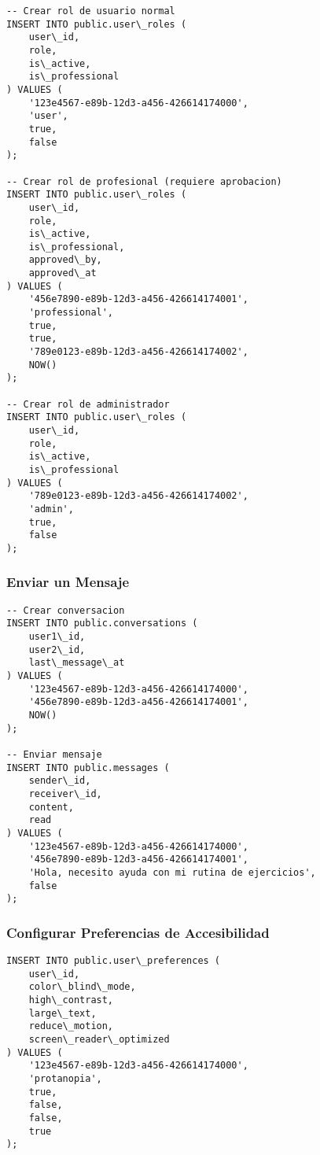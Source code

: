\documentclass[12pt,a4paper]{article}
\begin{document}
\begin{lstlisting}[caption=Ejemplo de inserción de rol de usuario]
-- Crear rol de usuario normal
INSERT INTO public.user\_roles (
    user\_id,
    role,
    is\_active,
    is\_professional
) VALUES (
    '123e4567-e89b-12d3-a456-426614174000',
    'user',
    true,
    false
);

-- Crear rol de profesional (requiere aprobacion)
INSERT INTO public.user\_roles (
    user\_id,
    role,
    is\_active,
    is\_professional,
    approved\_by,
    approved\_at
) VALUES (
    '456e7890-e89b-12d3-a456-426614174001',
    'professional',
    true,
    true,
    '789e0123-e89b-12d3-a456-426614174002',
    NOW()
);

-- Crear rol de administrador
INSERT INTO public.user\_roles (
    user\_id,
    role,
    is\_active,
    is\_professional
) VALUES (
    '789e0123-e89b-12d3-a456-426614174002',
    'admin',
    true,
    false
);
\end{lstlisting}

\subsubsection{Enviar un Mensaje}

\begin{lstlisting}[caption=Ejemplo de envío de mensaje]
-- Crear conversacion
INSERT INTO public.conversations (
    user1\_id,
    user2\_id,
    last\_message\_at
) VALUES (
    '123e4567-e89b-12d3-a456-426614174000',
    '456e7890-e89b-12d3-a456-426614174001',
    NOW()
);

-- Enviar mensaje
INSERT INTO public.messages (
    sender\_id,
    receiver\_id,
    content,
    read
) VALUES (
    '123e4567-e89b-12d3-a456-426614174000',
    '456e7890-e89b-12d3-a456-426614174001',
    'Hola, necesito ayuda con mi rutina de ejercicios',
    false
);
\end{lstlisting}

\subsubsection{Configurar Preferencias de Accesibilidad}

\begin{lstlisting}[caption=Ejemplo de configuración de accesibilidad]
INSERT INTO public.user\_preferences (
    user\_id,
    color\_blind\_mode,
    high\_contrast,
    large\_text,
    reduce\_motion,
    screen\_reader\_optimized
) VALUES (
    '123e4567-e89b-12d3-a456-426614174000',
    'protanopia',
    true,
    false,
    false,
    true
);
\end{lstlisting}
\end{document}
